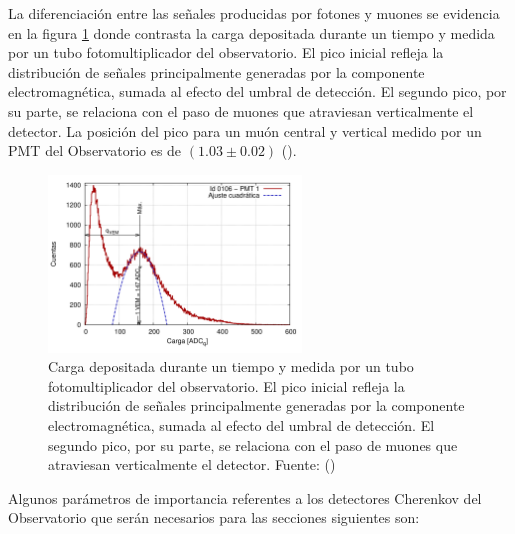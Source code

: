La diferenciación entre las señales producidas por fotones y muones se evidencia en la figura \ref{cargahist} donde contrasta la carga depositada durante un tiempo y medida por un tubo fotomultiplicador del observatorio. El pico inicial refleja la distribución de señales principalmente generadas por la componente electromagnética, sumada al efecto del umbral de detección. El segundo pico, por su parte, se relaciona con el paso de muones que atraviesan verticalmente el detector. La posición del pico para un muón central y vertical medido por un PMT del Observatorio es de $(1.03\pm0.02)$ (\cite{asorey_2012}).

\begin{figure}[h!]
  \centering
\includegraphics[width=0.6\textwidth]{Figs/histograma_carga.png}
  \caption{Carga depositada durante un tiempo y medida por un tubo fotomultiplicador del observatorio. El pico inicial refleja la distribución de señales principalmente generadas por la componente electromagnética, sumada al efecto del umbral de detección. El segundo pico, por su parte, se relaciona con el paso de muones que atraviesan verticalmente el detector. Fuente: (\cite{asorey_2012})}
  \label{cargahist}
\end{figure}
Algunos parámetros de importancia referentes a los detectores Cherenkov del Observatorio que serán necesarios para las secciones siguientes son:
